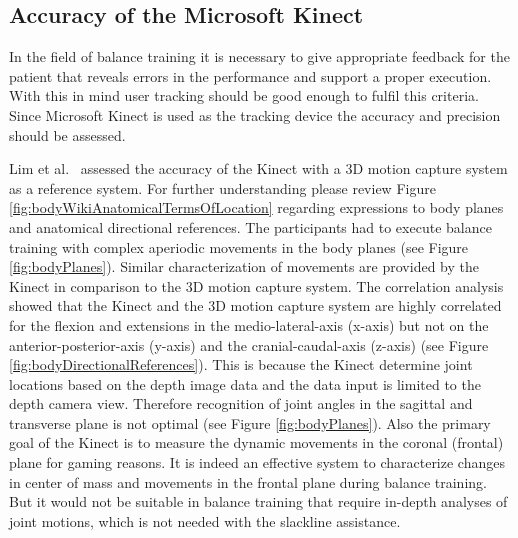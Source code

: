 \subsection{Accuracy of the Microsoft Kinect}

In the field of balance training it is necessary to give appropriate feedback for the patient that reveals errors in the performance and support a proper execution. With this in mind user tracking should be good enough to fulfil this criteria. Since Microsoft Kinect is used as the tracking device the accuracy and precision should be assessed.

Lim et al.~\cite{Lim2015-pw} assessed the accuracy of the Kinect with a 3D motion capture system as a reference system. For further understanding please review Figure \ref{fig:bodyWikiAnatomicalTermsOfLocation} regarding expressions to body planes and anatomical directional references. The participants had to execute balance training with complex aperiodic movements in the body planes (see Figure \ref{fig:bodyPlanes}). Similar characterization of movements are provided by the Kinect in comparison to the 3D motion capture system. The correlation analysis showed that the Kinect and the 3D motion capture system are highly correlated for the flexion and extensions in the medio-lateral-axis (x-axis) but not on the anterior-posterior-axis (y-axis) and the cranial-caudal-axis (z-axis) (see Figure \ref{fig:bodyDirectionalReferences}). This is because the Kinect determine joint locations based on the depth image data and the data input is limited to the depth camera view. Therefore recognition of joint angles in the sagittal and transverse plane is not optimal (see Figure \ref{fig:bodyPlanes}). Also the primary goal of the Kinect is to measure the dynamic movements in the coronal (frontal) plane for gaming reasons. It is indeed an effective system to characterize changes in center of mass and movements in the frontal plane during balance training. But it would not be suitable in balance training that require in-depth analyses of joint motions, which is not needed with the slackline assistance.

